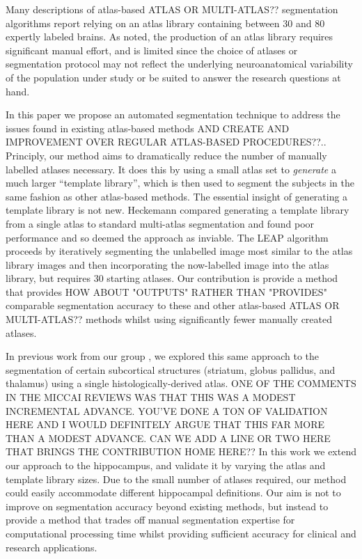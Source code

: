 \documentclass{article}
\begin{document}
Many descriptions of atlas-based  {ATLAS OR MULTI-ATLAS??} segmentation algorithms report relying on an
atlas library containing between 30 and 80 expertly labeled
brains\cite{Heckemann2011,Collins2010,Aljabar2009,Leung2010,Lotjonen2010}.
As noted, the production of an atlas library requires significant manual
effort, and is limited since the choice of atlases or segmentation protocol may
not reflect the underlying neuroanatomical variability of the population under
study or be suited to answer the research questions at hand.

In this paper we propose an automated segmentation technique to address the
issues found in existing atlas-based methods  {AND CREATE AND IMPROVEMENT OVER REGULAR ATLAS-BASED PROCEDURES??}.. Principly, our method aims to
dramatically reduce the number of manually labelled atlases necessary.  It does
this by using a small atlas set to {\it generate} a much larger ``template
library'', which is then used to segment the subjects in the same fashion as
other atlas-based methods.  The essential insight of generating a template
library is not new.  Heckemann \cite{Heckemann2006} compared generating a
template library from a single atlas to standard multi-atlas segmentation and
found poor performance and so deemed the approach as inviable.  The LEAP
algorithm \cite{Wolz2010} proceeds by iteratively segmenting the unlabelled
image most similar to the atlas library images and then incorporating the
now-labelled image into the atlas library, but requires 30 starting atlases.
Our contribution is provide a method that provides {HOW ABOUT "OUTPUTS" RATHER THAN "PROVIDES"} comparable segmentation
accuracy to these and other atlas-based  {ATLAS OR MULTI-ATLAS??} methods whilst using significantly
fewer manually created atlases.

In previous work from our group \cite{Chakravarty2011}, we explored
this same approach to the segmentation of certain subcortical structures (striatum,
globus pallidus, and thalamus) using a single histologically-derived atlas.  {ONE OF THE COMMENTS IN THE MICCAI REVIEWS WAS THAT THIS WAS A MODEST INCREMENTAL ADVANCE.  YOU'VE DONE A TON OF VALIDATION HERE AND I WOULD DEFINITELY ARGUE THAT THIS FAR MORE THAN A MODEST ADVANCE.  CAN WE ADD A LINE OR TWO HERE THAT BRINGS THE CONTRIBUTION HOME HERE??}
In this work we extend our approach to the hippocampus, and validate it by
varying the atlas and template library sizes.  Due to the small number of
atlases required, our method could easily accommodate different hippocampal
definitions.  Our aim is not to improve on segmentation accuracy beyond
existing methods, but instead to provide a method that trades off manual
segmentation expertise for computational processing time whilst providing
sufficient accuracy for clinical and research applications.
\end{document}
